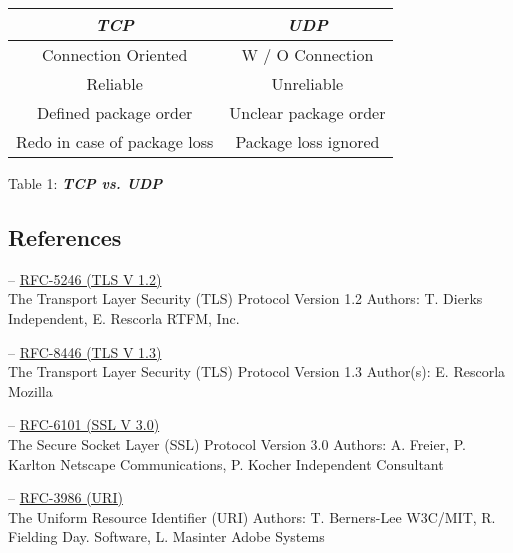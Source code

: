 \documentclass[10pt,a4paper,english]{article}
\newcommand{\abbrhighcol}[1]{\textbf{\textit{#1}}}
\begin{document}
\begin{center}
\begin{tabular}{|c|c|}
\hline
\hline
\abbrhighcol{TCP} & \abbrhighcol{UDP} \\
\hline
Connection Oriented & W / O Connection \\ 
 \hline
 Reliable & Unreliable \\
 \hline  
 Defined package order & Unclear package order \\
 \hline  
Redo in case of package loss & Package loss ignored \\
 \hline 
 \end{tabular}
\end{center}
Table 1: \abbrhighcol{TCP vs. UDP}
\label{tab:TCPvsUDP}
\begin{multicols}{2}
\section{References}
\label{sec:references}
\begin{flushleft}
\hspace*{1em}-- \href{https://datatracker.ietf.org/doc/html/rfc5246}{RFC-5246 (TLS V 1.2)}\\The Transport Layer Security (TLS) Protocol Version 1.2 Authors:   T. Dierks
Independent,  E. Rescorla RTFM, Inc.\\
\end{flushleft}
\begin{flushleft}
\hspace*{1em}-- \href{https://datatracker.ietf.org/doc/html/rfc8446}{RFC-8446 (TLS V 1.3)}\\The Transport Layer Security (TLS) Protocol Version 1.3 Author(s): E. Rescorla Mozilla\\
\end{flushleft}
\begin{flushleft}
\hspace*{1em}-- \href{https://datatracker.ietf.org/doc/html/rfc6101}{RFC-6101 (SSL V 3.0)}\\The Secure Socket Layer  (SSL) Protocol Version 3.0 Authors: A. Freier, P. Karlton Netscape Communications, P. Kocher Independent Consultant\\
\end{flushleft}
\begin{flushleft}
\hspace*{1em}-- \href{https://datatracker.ietf.org/doc/html/rfc3986}{RFC-3986 (URI)}\\The Uniform Resource Identifier (URI) Authors: T. Berners-Lee W3C/MIT, R. Fielding Day. Software, L. Masinter Adobe Systems\\

\end{flushleft}
\end{multicols}
\end{document}
